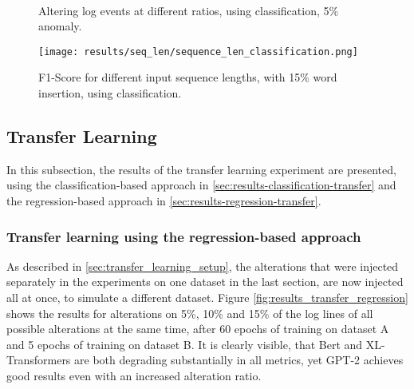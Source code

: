 \begin{figure*}[ht!]
\hspace{\fill}
\hspace{\fill}
   \\
\caption{\label{fig:results_multiclass_qualitative}Altering log events at different ratios, using classification, 5\% anomaly.}
\end{figure*}

\begin{figure}[h]
  \centering
  \texttt{[image: results/seq\_len/sequence\_len\_classification.png]}\\
  \caption{F1-Score for different input sequence lengths, with 15\% word insertion, using classification.}
  \label{fig:seq_len_classification}
\end{figure}



\subsection{Transfer Learning\label{sec:results_transfer}}
In this subsection, the results of the transfer learning experiment are presented, using the classification-based approach in \ref{sec:results-classification-transfer} and the regression-based approach in \ref{sec:results-regression-transfer}.


\subsubsection{Transfer learning using the regression-based approach \label{sec:results-regression-transfer}}

As described in \ref{sec:transfer_learning_setup}, the alterations that were injected separately in the experiments on one dataset in the last section, are now injected all at once, to simulate a different dataset. Figure \ref{fig:results_transfer_regression} shows the results for alterations on 5\%, 10\% and 15\% of the log lines of all possible alterations at the same time, after 60 epochs of training on dataset A and 5 epochs of training on dataset B. It is clearly visible, that Bert and XL-Transformers are both degrading substantially in all metrics, yet GPT-2 achieves good results even with an increased alteration ratio.

